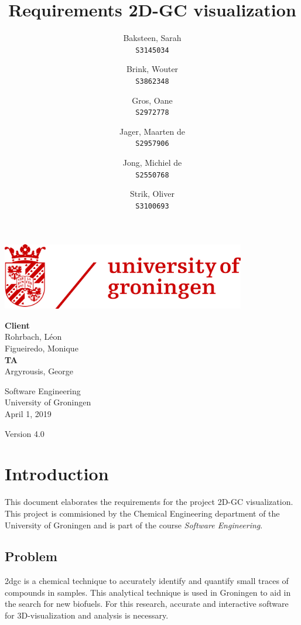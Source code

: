 \documentclass{article}
\title{Requirements 2D-GC visualization}
\author{
  Baksteen, Sarah\\
  \texttt{S3145034}
  \and
  Brink, Wouter\\
  \texttt{S3862348}
  \and
  Gros, Oane\\
  \texttt{S2972778}
  \and
  Jager, Maarten de \\
  \texttt{S2957906}
  \and
  Jong, Michiel de \\
  \texttt{S2550768}
  \and
  Strik, Oliver\\
  \texttt{S3100693}
}
\date{}
\begin{document}
\clearpage
\maketitle
\thispagestyle{empty}
\begin{center}
    \vfill
    \includegraphics[width=0.8\textwidth]{UG_logo.jpg}
    \vfill
    
    \Large
    \textbf{Client} \\
    Rohrbach, Léon \\
    Figueiredo, Monique \\
    
    \vspace{1cm}
    \textbf{TA} \\
    Argyrousis, George
    
    \vspace{2cm}
        Software Engineering \\
        University of Groningen \\
        April 1, 2019  \\
        \empty
        
        \vspace{1cm}
        Version 4.0
\end{center}

\newpage\setcounter{page}{1}
\section{Introduction}
This document elaborates the requirements for the project 2D-GC visualization. This project is commisioned by the Chemical Engineering department of the University of Groningen and is part of the course \textit{Software Engineering}.  

\subsection*{Problem}
\acrfull{2dgc}  is a chemical technique to accurately identify and quantify small traces of compounds in samples. This analytical technique is used in Groningen to aid in the search for new biofuels. For this research, accurate and interactive software for 3D-visualization and analysis is necessary. 
\end{document}

